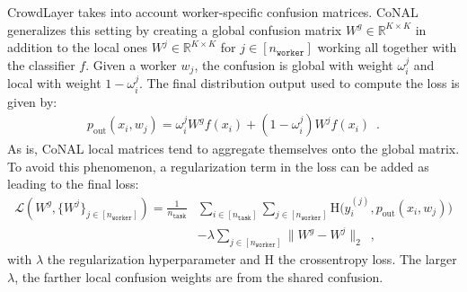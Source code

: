 CrowdLayer takes into account worker-specific confusion matrices.
CoNAL \citep{chu2021learning} generalizes this setting by creating a global confusion matrix $W^g\in\mathbb{R}^{K\times K}$ in addition to the local ones $W^j\in\mathbb{R}^{K\times K}$ for $j\in[n_{\texttt{worker}}]$ working all together with the classifier $f$.
Given a worker $w_j$, the confusion is global with weight $\omega_i^j$ and local with weight $1-\omega_i^j$.
The final distribution output used to compute the loss is given by:
\begin{align*}
    p_{\text{out}}(x_i, w_j) = \omega _i^j W^g f(x_i) + (1-\omega_i^j)W^j f(x_i) \enspace.
\end{align*}
As is, CoNAL local matrices tend to aggregate themselves onto the global matrix.
To avoid this phenomenon, a regularization term in the loss can be added as leading to the final loss:
\begin{align*}
    \mathcal{L}(W^g, \{W^j\}_{j\in [n_\texttt{worker}]}) = \frac{1}{n_\texttt{task}} &\sum_{i\in [n_\texttt{task}]}\sum_{j\in [n_\texttt{worker}]} \mathrm{H}\Big(y_i^{(j)}, p_{\text{out}}(x_i, w_j)\Big) \\ &- \lambda \sum_{j\in [n_\texttt{worker}]} \| W^g - W^j\|_2 \enspace,
\end{align*}
with $\lambda$ the regularization hyperparameter and $\mathrm{H}$ the crossentropy loss. The larger $\lambda$, the farther local confusion weights are from the shared confusion.

